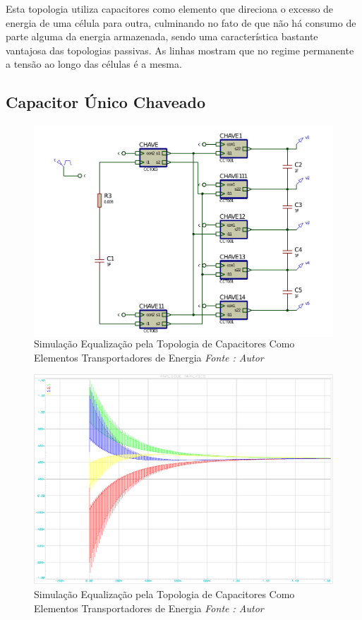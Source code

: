\documentclass[11pt, a4paper, oneside]{article}
\begin{document}
Esta topologia utiliza capacitores como elemento que direciona o excesso de
energia de uma célula para outra, culminando no fato de que não há consumo de
parte alguma da energia armazenada, sendo uma característica bastante vantajosa
das topologias passivas. As linhas mostram que no regime permanente a tensão ao
longo das células é a mesma.

\newpage

\subsection{Capacitor Único Chaveado}

\begin{figure}[h!]
\centering
\includegraphics[width=1\linewidth]{ETCC1}
\caption{Simulação Equalização pela Topologia de Capacitores Como Elementos Transportadores de Energia \textit{Fonte : Autor}}
\label{fig:estrutura_equalizador_passivo_ apacitor}
\end{figure}

\begin{figure}[h!]
\centering
\includegraphics[width=.8\linewidth]{etcc}
\caption{Simulação Equalização pela Topologia de Capacitores Como Elementos Transportadores de Energia \textit{Fonte : Autor}}
\label{fig:estrutura_equalizador_passivo_ apacitor}
\end{figure}
\end{document}
